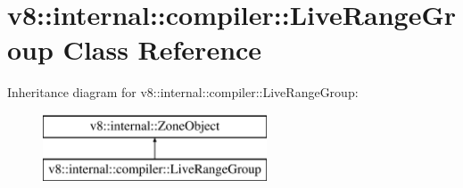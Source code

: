\hypertarget{classv8_1_1internal_1_1compiler_1_1_live_range_group}{}\section{v8\+:\+:internal\+:\+:compiler\+:\+:Live\+Range\+Group Class Reference}
\label{classv8_1_1internal_1_1compiler_1_1_live_range_group}
Inheritance diagram for v8\+:\+:internal\+:\+:compiler\+:\+:Live\+Range\+Group\+:\begin{figure}[H]
\begin{center}
\leavevmode
\includegraphics[height=2.000000cm]{classv8_1_1internal_1_1compiler_1_1_live_range_group}
\end{center}
\end{figure}
